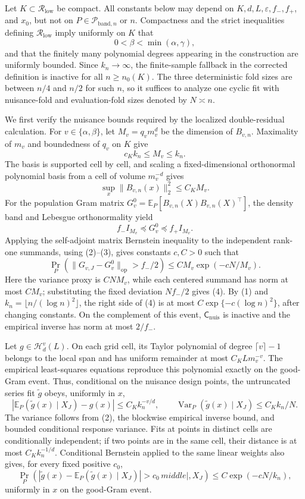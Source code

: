 Let \(K\subset\mathcal R_{\mathrm{low}}\) be compact.  All constants below
may depend on \(K,d,L,\varepsilon,f_-,f_+\), and \(x_0\), but not on
\(P\in\mathcal P_{\mathrm{band},n}\) or \(n\).  Compactness and the strict
inequalities defining \(\mathcal R_{\mathrm{low}}\) imply uniformly on
\(K\) that
\[
0<\beta<\min(\alpha,\gamma),
\]
and that the finitely many polynomial degrees appearing in the construction
are uniformly bounded.  Since \(k_n\to\infty\), the finite-sample fallback in
the corrected definition is inactive for all \(n\geq n_0(K)\).  The three
deterministic fold sizes are between \(n/4\) and \(n/2\) for such \(n\), so
it suffices to analyze one cyclic fit with nuisance-fold and evaluation-fold
sizes denoted by \(N\asymp n\).

We first verify the nuisance bounds required by the localized double-residual
calculation.  For \(v\in\{\alpha,\beta\}\), let
\(M_v=q_vm_v^d\) be the dimension of \(B_{v,n}\).  Maximality of \(m_v\)
and boundedness of \(q_v\) on \(K\) give
\[
c_Kk_n\leq M_v\leq k_n. \tag{1}
\]
The basis is supported cell by cell, and scaling a fixed-dimensional
orthonormal polynomial basis from a cell of volume \(m_v^{-d}\) gives
\[
\sup_x\|B_{v,n}(x)\|_2^2\leq C_KM_v. \tag{2}
\]
For the population Gram matrix \(G_v^0=\mathbb E_P[B_{v,n}(X)
B_{v,n}(X)^\top]\), the density band and Lebesgue orthonormality yield
\[
f_-I_{M_v}\preceq G_v^0\preceq f_+I_{M_v}. \tag{3}
\]
Applying the self-adjoint matrix Bernstein inequality to the independent
rank-one summands, using (2)--(3), gives constants \(c,C>0\) such that
\[
\Pr_P\!\left(\|G_{v,J}-G_v^0\|_{\mathrm{op}}>f_-/2\right)
\leq C M_v\exp(-cN/M_v). \tag{4}
\]
Here the variance proxy is \(C NM_v\), while each centered summand has norm
at most \(CM_v\); substituting the fixed deviation \(Nf_-/2\) gives (4).
By (1) and \(k_n=\lfloor n/(\log n)^2\rfloor\), the right side of (4) is
at most \(C\exp\{-c(\log n)^2\}\), after changing constants.  On the
complement of this event, \(\mathsf C_{\mathrm{nuis}}\) is inactive and the
empirical inverse has norm at most \(2/f_-\).

Let \(g\in\mathcal H_d^v(L)\).  On each grid cell, its Taylor polynomial of
degree \(\lceil v\rceil-1\) belongs to the local span and has uniform
remainder at most \(C_KLm_v^{-v}\).  The empirical least-squares equations
reproduce this polynomial exactly on the good-Gram event.  Thus, conditional
on the nuisance design points, the untruncated series fit \(\widetilde g\)
obeys, uniformly in \(x\),
\[
\left|\mathbb E_P(\widetilde g(x)\mid X_J)-g(x)\right|
\leq C_K k_n^{-v/d},
\qquad
\operatorname{Var}_P(\widetilde g(x)\mid X_J)
\leq C_K k_n/N. \tag{5}
\]
The variance follows from (2), the blockwise empirical inverse bound, and
bounded conditional response variance.  Fits at points in distinct cells are
conditionally independent; if two points are in the same cell, their distance
is at most \(C_Kk_n^{-1/d}\).  Conditional Bernstein applied to the same
linear weights also gives, for every fixed positive \(c_0\),
\[
\Pr_P\!\left(
|\widetilde g(x)-\mathbb E_P(\widetilde g(x)\mid X_J)|>c_0
\,middle|,X_J\right)
\leq C\exp(-cN/k_n), \tag{6}
\]
uniformly in \(x\) on the good-Gram event.

